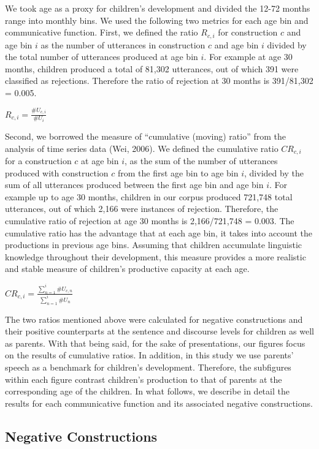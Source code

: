 \documentclass[
  english,
  man,floatsintext]{apa6}
\begin{document}
We took age as a proxy for children's development and divided the 12-72 months range into monthly bins. We used the following two metrics for each age bin and communicative function. First, we defined the ratio \(R_{c,i}\) for construction \(c\) and age bin \(i\) as the number of utterances in construction \(c\) and age bin \(i\) divided by the total number of utterances produced at age bin \(i\). For example at age 30 months, children produced a total of 81,302 utterances, out of which 391 were classified as rejections. Therefore the ratio of rejection at 30 months is 391/81,302 = 0.005.

\(R_{c, i} = \frac{\#U_{c,i}}{\#U_{i}}\)

Second, we borrowed the measure of ``cumulative (moving) ratio'' from the analysis of time series data (Wei, 2006). We defined the cumulative ratio \(CR_{c,i}\) for a construction \(c\) at age bin \(i\), as the sum of the number of utterances produced with construction \(c\) from the first age bin to age bin \(i\), divided by the sum of all utterances produced between the first age bin and age bin \(i\). For example up to age 30 months, children in our corpus produced 721,748 total utterances, out of which 2,166 were instances of rejection. Therefore, the cumulative ratio of rejection at age 30 months is 2,166/721,748 = 0.003. The cumulative ratio has the advantage that at each age bin, it takes into account the productions in previous age bins. Assuming that children accumulate linguistic knowledge throughout their development, this measure provides a more realistic and stable measure of children's productive capacity at each age.

\(CR_{c, i} = \frac{\sum_{n=1}^{i} \#U_{c,n}}{\sum_{n=1}^{i} \#U_{n}}\)

The two ratios mentioned above were calculated for negative constructions and their positive counterparts at the sentence and discourse levels for children as well as parents. With that being said, for the sake of presentations, our figures focus on the results of cumulative ratios. In addition, in this study we use parents' speech as a benchmark for children's development. Therefore, the subfigures within each figure contrast children's production to that of parents at the corresponding age of the children. In what follows, we describe in detail the results for each communicative function and its associated negative constructions.

\hypertarget{negative-constructions}{%
\subsection{Negative Constructions}\label{negative-constructions}}
\end{document}
